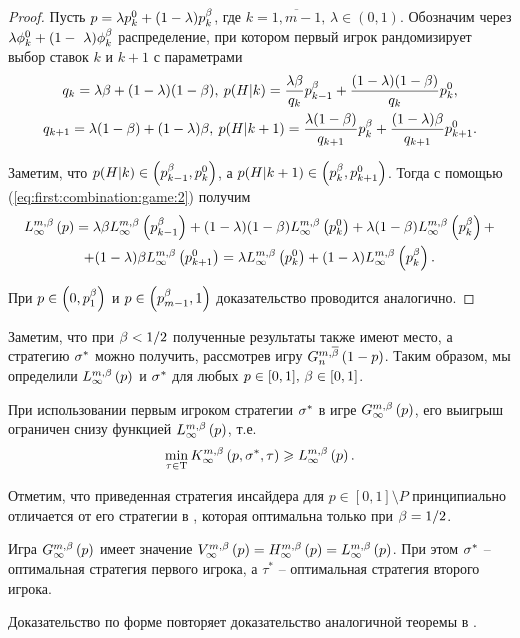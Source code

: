 \begin{proof}
  Пусть $p = \lambda\pEven + (1-\lambda)\pOdd$, где $k = \overline{1, m
    - 1}, \, \lambda \in (0, 1)$. Обозначим через $\lambda\fEven +
  (1-~\lambda)\fOdd$ распределение, при котором первый игрок
  рандомизирует выбор ставок $k$ и $k+1$ с параметрами
  \begin{gather*}
    q_k = \lambda\Co + (1-\lambda)(1-\Co), \: p(H|k) =
    \frac{\lambda\Co}{q_k}\pOdd[k-1] +
    \frac{(1-\lambda)(1-\Co)}{q_k} \pEven,\\
    q_{k+1} = \lambda(1-\Co) + (1-\lambda)\Co, \: p(H|k+1) =
    \frac{\lambda(1-\Co)}{q_{k+1}}\pOdd[k] +
    \frac{(1-\lambda)\Co}{q_{k+1}}\pEven[k+1].
  \end{gather*}
  
  Заметим, что $p(H|k) \in \left( \pOdd[k-1], \pEven \right)$, а
  $p(H|k+1) \in \left( \pOdd, \pEven[k+1] \right)$. Тогда с помощью
  (\ref{eq:first:combination:game:2}) получим
  \begin{multline*}
    \lowerBound{p} = \lambda \Co \lowerBound{\pOdd[k-1]} + (1-\lambda)(1-\Co)\lowerBound{\pEven} + \lambda(1-\Co)\lowerBound{\pOdd} + \\
    + (1-\lambda)\Co\lowerBound{\pEven[k+1]} = \lambda
    \lowerBound{\pEven} + (1-\lambda) \lowerBound{\pOdd}.
  \end{multline*}
  
  При $p \in \left( 0, \pOdd[1] \right)$ и $p \in \left( \pOdd[m-1], 1
  \right)$ доказательство проводится аналогично.
\end{proof}

Заметим, что при $\Co < 1/2$ полученные результаты также имеют место,
а стратегию $\fOpt$ можно получить, рассмотрев игру
$\symmGameExpression[n]{1-p}$. Таким образом, мы определили $\lowerBound{p}$
и $\fOpt$ для любых $p \in [0, 1], \, \Co \in [0, 1]$.

\begin{lemma}
  \label{lemma:first:lower}
  При использовании первым игроком стратегии $\fOpt$ в игре
  $\infiniteGame{p}$\textup{,} его выигрыш ограничен снизу функцией
  $\lowerBound{p}$\textup{,} т.е.
  \[
    \min_{\tau \in \Tau} \infiniteFirstPlayerPayoff{p}{\fOpt}{\tau} \geq
    \lowerBound{p}.
  \]
\end{lemma}

Отметим, что приведенная стратегия инсайдера для $p \in [0, 1] \setminus
P$ принципиально отличается от его стратегии в \cite{pyanykh14}, которая
оптимальна только при $\Co = 1/2$.

\begin{theorem}
  Игра $\infiniteGame{p}$ имеет значение $\infiniteGameValue{p} = \upperBound{p}
  = \lowerBound{p}$. При этом $\fOpt$ -- оптимальная стратегия первого
  игрока\textup{,} а $\tau^*$ -- оптимальная стратегия второго игрока.
\end{theorem}
Доказательство по форме повторяет доказательство аналогичной теоремы в
\cite{domansky07}.

